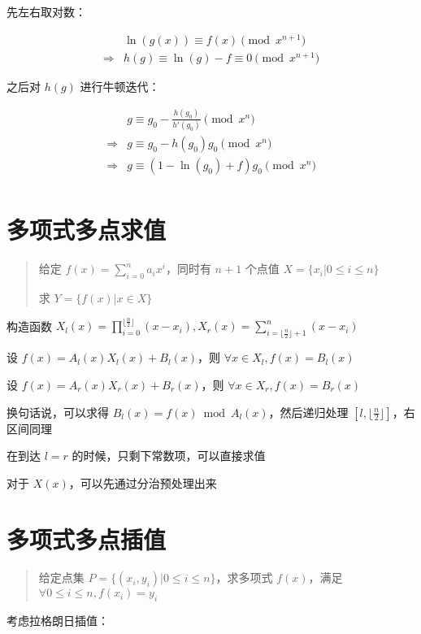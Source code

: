 \documentclass[UTF8]{article}
\begin{document}
先左右取对数：

$$
\begin{aligned}
& \ln(g(x)) \equiv f(x) \pmod {x^{n+1}} \\
\Rightarrow
&h(g) \equiv \ln(g)-f \equiv 0\pmod  {x^{n+1}}
\end{aligned}
$$

之后对 $h(g)$ 进行牛顿迭代：

$$
\begin{aligned}
& g \equiv g_0-\frac{h(g_0)}{h'(g_0)} \pmod {x^{n}} \\
\Rightarrow 
& g \equiv g_0-h(g_0)g_0 \pmod {x^{n}} \\
\Rightarrow 
& g \equiv (1-\ln(g_0)+f)g_0\pmod {x^{n}} \\
\end{aligned}
$$

\section{多项式多点求值}

\begin{quotation}
    给定 $f(x)=\sum_{i=0}^{n}a_ix^i$，同时有 $n+1$ 个点值 $X=\{x_i | 0 \le i \le n\}$
    
    求 $Y=\{f(x) | x \in X\}$
\end{quotation}

构造函数 $X_l(x)=\prod_{i=0}^{\lfloor \frac{n}{2} \rfloor}(x-x_i),X_r(x)=\sum_{i=\lfloor \frac{n}{2} \rfloor+1}^{n}(x-x_i)$

设 $f(x)=A_l(x)X_l(x)+B_l(x)$，则 $\forall x \in X_l,f(x)=B_l(x)$

设 $f(x)=A_r(x)X_r(x)+B_r(x)$，则 $\forall x \in X_r,f(x)=B_r(x)$

换句话说，可以求得 $B_l(x)=f(x) \bmod A_l(x)$，然后递归处理 $[l,\lfloor \frac{n}{2} \rfloor]$，右区间同理

在到达 $l=r$ 的时候，只剩下常数项，可以直接求值

对于 $X(x)$，可以先通过分治预处理出来

\section{多项式多点插值}

\begin{quotation}
    给定点集 $P=\{(x_i,y_i) | 0 \le i \le n\}$，求多项式 $f(x)$，满足 $\forall 0 \le i \le n, f(x_i)=y_i$
\end{quotation}

考虑拉格朗日插值：
\end{document}
